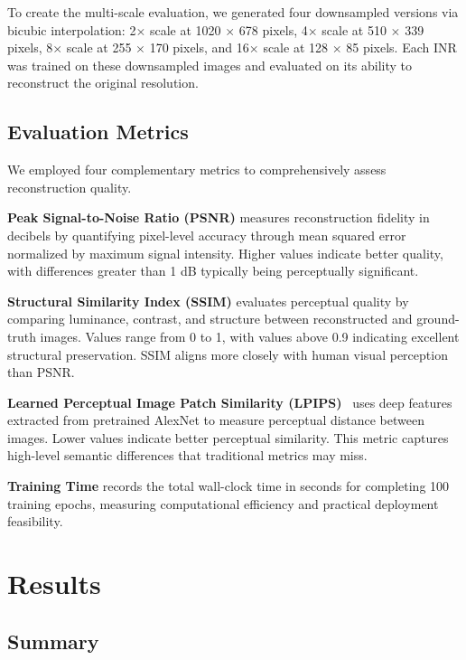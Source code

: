 \documentclass[a4paper,oneside,10pt,ngerman,english]{scrartcl}
\begin{document}
To create the multi-scale evaluation, we generated four downsampled versions via bicubic interpolation: 2$\times$ scale at 1020 $\times$ 678 pixels, 4$\times$ scale at 510 $\times$ 339 pixels, 8$\times$ scale at 255 $\times$ 170 pixels, and 16$\times$ scale at 128 $\times$ 85 pixels. Each INR was trained on these downsampled images and evaluated on its ability to reconstruct the original resolution.

\subsection{Evaluation Metrics}

We employed four complementary metrics to comprehensively assess reconstruction quality.

\textbf{Peak Signal-to-Noise Ratio (PSNR)} measures reconstruction fidelity in decibels by quantifying pixel-level accuracy through mean squared error normalized by maximum signal intensity. Higher values indicate better quality, with differences greater than 1 dB typically being perceptually significant.

\textbf{Structural Similarity Index (SSIM)} evaluates perceptual quality by comparing luminance, contrast, and structure between reconstructed and ground-truth images. Values range from 0 to 1, with values above 0.9 indicating excellent structural preservation. SSIM aligns more closely with human visual perception than PSNR.

\textbf{Learned Perceptual Image Patch Similarity (LPIPS)}~\cite{zhang2018lpips} uses deep features extracted from pretrained AlexNet to measure perceptual distance between images. Lower values indicate better perceptual similarity. This metric captures high-level semantic differences that traditional metrics may miss.

\textbf{Training Time} records the total wall-clock time in seconds for completing 100 training epochs, measuring computational efficiency and practical deployment feasibility.

\newpage
\section{Results}

\subsection{Summary}
\end{document}
